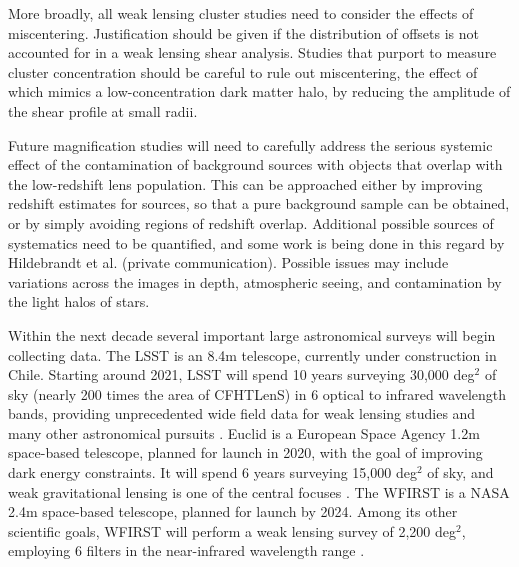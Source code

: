 More broadly, all weak lensing cluster studies need to consider the effects of miscentering. Justification should be given if the distribution of offsets is not accounted for in a weak lensing shear analysis. Studies that purport to measure cluster concentration should be careful to rule out miscentering, the effect of which mimics a low-concentration dark matter halo, by reducing the amplitude of the shear profile at small radii. 

Future magnification studies will need to carefully address the serious systemic effect of the contamination of background sources with objects that overlap with the low-redshift lens population. This can be approached either by improving redshift estimates for sources, so that a pure background sample can be obtained, or by simply avoiding regions of redshift overlap. Additional possible sources of systematics need to be quantified, and some work is being done in this regard by Hildebrandt et al. (private communication). Possible issues may include variations across the images in depth, atmospheric seeing, and contamination by the light halos of stars.

Within the next decade several important large astronomical surveys will begin collecting data. The \acf{LSST} is an 8.4m telescope, currently under construction in Chile. Starting around 2021, \ac{LSST} will spend 10 years surveying 30,000 deg$^2$ of sky (nearly 200 times the area of \ac{CFHTLenS}) in 6 optical to infrared wavelength bands, providing unprecedented wide field data for weak lensing studies and many other astronomical pursuits \citep{LSST2.0}. \acs{Euclid} is a European Space Agency 1.2m space-based telescope, planned for launch in 2020, with the goal of improving dark energy constraints. It will spend 6 years surveying 15,000 deg$^2$ of sky, and weak gravitational lensing is one of the central focuses \citep{Euclid}. The \acf{WFIRST} is a NASA 2.4m space-based telescope, planned for launch by 2024. Among its other scientific goals, \ac{WFIRST} will perform a weak lensing survey of 2,200 deg$^2$, employing 6 filters in the near-infrared wavelength range \citep{WFIRST}.

